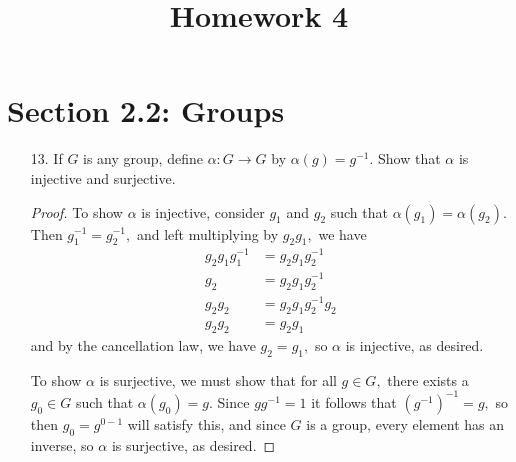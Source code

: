 \documentclass{article}
\begin{document}
\title{Homework 4}
\maketitle
\thispagestyle{fancy}

\section*{Section 2.2: Groups}
\begin{itemize}
	\item[13.] If $G$ is any group, define $\alpha:G\to G$ by $\alpha(g)=g^{-1}.$ Show that $\alpha$ is injective and surjective.
		\begin{proof}
			To show $\alpha$ is injective, consider $g_1$ and $g_2$ such that $\alpha(g_1)=\alpha(g_2).$ Then $g_1^{-1}=g_2^{-1},$ and left multiplying by $g_2g_1,$ we have 
			\begin{align*}
				g_2g_1g_1^{-1} &= g_2g_1g_2^{-1} \\
				g_2 &= g_2g_1g_2^{-1} \\
				g_2 g_2 &= g_2g_1g_2^{-1}g_2 \\
				g_2 g_2 &= g_2 g_1 
			\end{align*} and by the cancellation law, we have $g_2=g_1,$ so $\alpha$ is injective, as desired.

			To show $\alpha$ is surjective, we must show that for all $g\in G,$ there exists a $g_0\in G$ such that $\alpha(g_0)=g.$ Since $gg^{-1}=1$ it follows that $(g^{-1})^{-1}=g,$ so then $g_0=g^{0-1}$ will satisfy this, and since $G$ is a group, every element has an inverse, so $\alpha$ is surjective, as desired.
			
		\end{proof}
		
\end{itemize}
\end{document}
